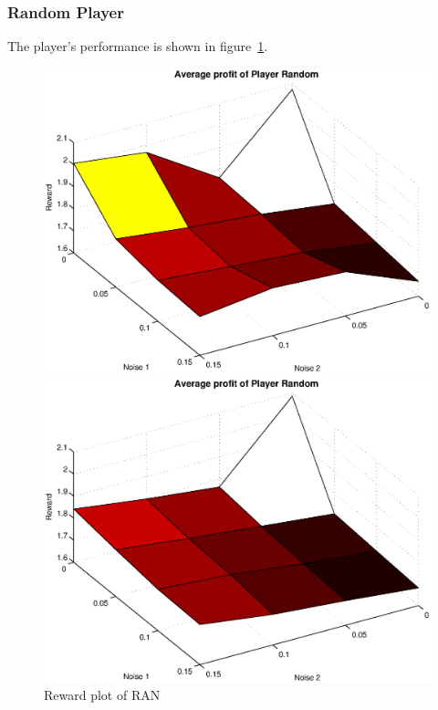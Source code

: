\subsubsection{Random Player}
The player's performance is shown in figure~\ref{pic player random}.\\
\begin{figure}[h]
	\caption{Reward plot of RAN}
	\label{pic player random}
\begin{minipage}[hbt]{0.65\textwidth}
	\centering
	\includegraphics[width=\textwidth]{pics/simulation1/Reward_vs_Noise_of_Player_Random}
\end{minipage}
\hfill
\begin{minipage}[hbt]{0.3\textwidth}
	\centering
	\includegraphics[width=\textwidth]{pics/simulation2/Reward_vs_Noise_of_Player_Random}
\end{minipage}

\end{figure}

